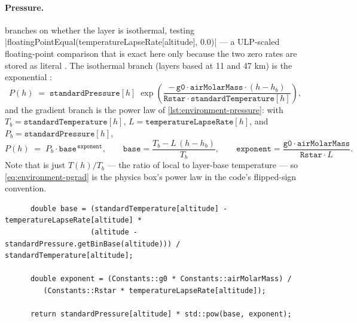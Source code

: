 \paragraph{Pressure.}  branches on whether the layer is isothermal,
testing \cppinline|floatingPointEqual(temperatureLapseRate[altitude], 0.0)|
 --- a ULP-scaled floating-point comparison
 that is exact here only because the two zero
rates are stored as literal  . The
isothermal branch (layers based at 11 and 47 km) is the exponential
:
\begin{equation}
P(h) \;=\; \mathtt{standardPressure}[h]\;
\exp\!\left(\frac{-\,\mathtt{g0}\cdot\mathtt{airMolarMass}\cdot(h - h_b)}
                 {\mathtt{Rstar}\cdot\mathtt{standardTemperature}[h]}\right),
\label{eq:environment-piso}
\end{equation}
and the gradient branch is the power law of \cref{lst:environment-pressure}: with
$T_b = \mathtt{standardTemperature}[h]$, $L = \mathtt{temperatureLapseRate}[h]$, and
$P_b = \mathtt{standardPressure}[h]$,
\begin{equation}
P(h) \;=\; P_b\cdot\mathtt{base}^{\,\mathtt{exponent}},
\qquad
\mathtt{base} = \frac{T_b - L\,(h - h_b)}{T_b},
\qquad
\mathtt{exponent} = \frac{\mathtt{g0}\cdot\mathtt{airMolarMass}}{\mathtt{Rstar}\cdot L}.
\label{eq:environment-pgrad}
\end{equation}
Note that  is just $T(h)/T_b$ --- the ratio of local to layer-base temperature ---
so \cref{eq:environment-pgrad} is the physics box's power law in the code's flipped-sign
convention.

\begin{listing}[htbp]
\begin{verbatim}
      double base = (standardTemperature[altitude] - temperatureLapseRate[altitude] *
                    (altitude - standardPressure.getBinBase(altitude))) / standardTemperature[altitude];

      double exponent = (Constants::g0 * Constants::airMolarMass) /
         (Constants::Rstar * temperatureLapseRate[altitude]);

      return standardPressure[altitude] * std::pow(base, exponent);
\end{verbatim}
\caption{The gradient-layer pressure power law as coded
: \texttt{base} is the temperature ratio
$T(h)/T_b$, and four \texttt{Bin} lookups anchor the layer.}\label{lst:environment-pressure}
\end{listing}

